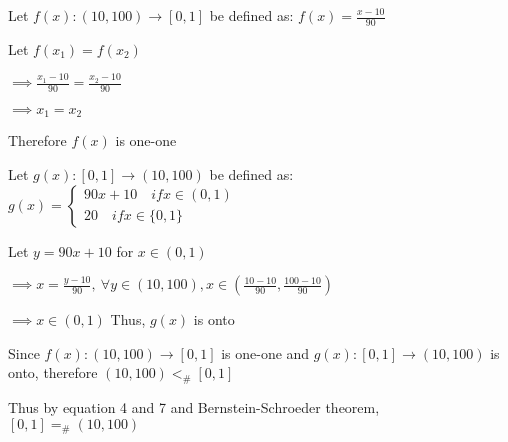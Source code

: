 \documentclass{article}
\begin{document}
    
    \quad Let $f(x): (10, 100) \to [0, 1]$  be defined as:
    $f(x) =  \frac{x-10}{90}$
    
    \quad Let $ f(x_{1})=f(x_{2}) $
    
    \quad $\implies \frac{x_{1}-10}{90}=\frac{x_{2}-10}{90} $ 
    
    \quad $\implies x_{1}=x_{2}$ 
    
    \quad Therefore $f(x)$ is one-one 
    
    \quad Let $g(x): [0,1] \to (10, 100)$  be defined as:
    $g(x) = 
         \begin{cases}
           90x+10 \quad if x \in (0,1) \\
           20  \quad if x \in \{0, 1\} 
         \end{cases}$
        
    \quad Let $y=90x+10$ for $x \in (0,1)$
    
    \quad $\implies x=\frac{y-10}{90}, ~ \forall
     y \in (10, 100), x \in (\frac{10-10}{90}, \frac{100-10}{90}) $
     
    \quad $\implies x \in (0, 1) $
    \quad Thus, $g(x)$ is onto 
    
    \quad Since $f(x): (10, 100) \to [0, 1]$ is one-one and $g(x): [0,1] \to (10, 100)$ is onto, therefore $(10, 100) <_{\#} [0, 1]$ 
    
    
    \quad Thus by equation 4 and 7 and Bernstein-Schroeder theorem, $[0, 1] =_{\#} (10, 100) $
    
    
\end{document}
